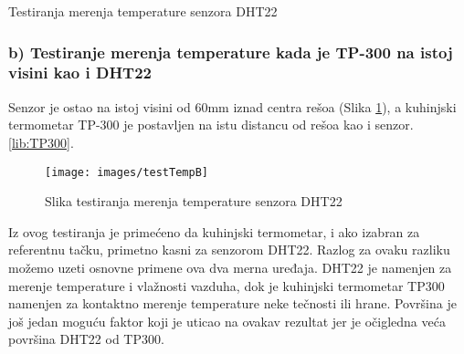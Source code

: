 \documentclass[a4paper, 12pt]{article}
\begin{document}
\vspace{10pt}

\begin{grafik}
\begin{center}
\end{center}			
\caption{Testiranja merenja temperature senzora DHT22}\label{grafiik:tempA}
\end{grafik}

\pagebreak

	\subsubsection*{b) Testiranje merenja temperature kada je TP-300 na istoj visini kao i DHT22}

\vspace{10pt}		
		
Senzor je ostao na istoj visini od 60mm iznad centra rešoa (Slika \ref{fig:testTempB}), a kuhinjski termometar TP-300 je postavljen na istu distancu od rešoa kao i senzor.\ref{lib:TP300}.

\vspace{10pt}

\begin{figure}[H]
\centering
\texttt{[image: images/testTempB]}
\caption{Slika testiranja merenja temperature senzora DHT22} \label{fig:testTempB}
\end{figure}

\pagebreak

Iz ovog testiranja je primećeno da kuhinjski termometar, i ako izabran za referentnu tačku, primetno kasni za senzorom DHT22. Razlog za ovaku razliku možemo uzeti osnovne primene ova dva merna uređaja. DHT22 je namenjen za merenje temperature i vlažnosti vazduha, dok je kuhinjski termometar TP300 namenjen za kontaktno merenje temperature neke tečnosti ili hrane. Površina je još jedan moguću faktor koji je uticao na ovakav rezultat jer je očigledna veća površina DHT22 od TP300.
\end{document}
